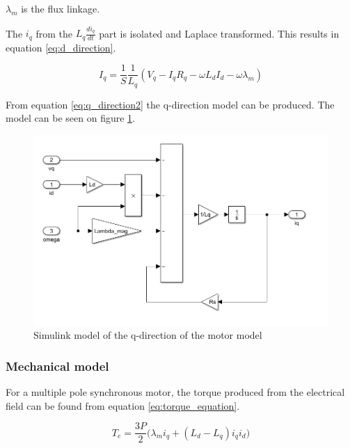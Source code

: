 
$\lambda_m$ is the flux linkage.

The $i_q$ from the $L_q \frac{di_q}{dt}$ part is isolated and Laplace transformed. This results in equation \ref{eq:d_direction}.

\begin{equation}
    \label{eq:q_direction2}
    I_q = \frac{1}{S} \frac{1}{L_q} (V_q - I_q R_q - \omega L_d I_d - \omega \lambda_m)
\end{equation}

From equation \ref{eq:q_direction2} the q-direction model can be produced. The model can be seen on figure \ref{fig:simulink_q_direction}.

\begin{figure}[H]
	\centering
	\includegraphics[width=0.8\linewidth]{pictures/control/simulink_q_direction.PNG}
	\caption{Simulink model of the q-direction of the motor model}
	\label{fig:simulink_q_direction}
\end{figure}


\subsubsection{Mechanical model}
For a multiple pole synchronous motor, the torque produced from the electrical field can be found from equation \ref{eq:torque_equation}.

\begin{equation}
    \label{eq:torque_equation}
    T_e = \frac{3P}{2} \big(\lambda_m i_{q} + (L_d - L_q) i_q i_{d}\big)
\end{equation}

